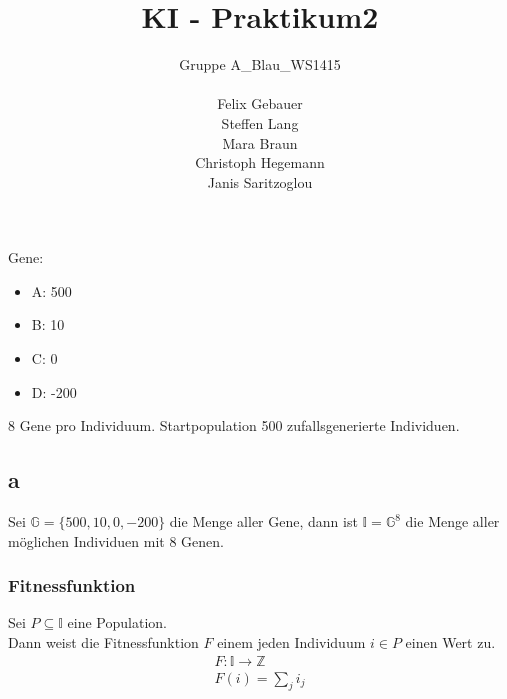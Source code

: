 \documentclass[12pt, a4paper]{article}
\title{KI - Praktikum2}
\author{Gruppe A\_Blau\_WS1415\\\\
    Felix Gebauer\\
    Steffen Lang\\
    Mara Braun\\
    Christoph Hegemann\\
    Janis Saritzoglou}
\begin{document}
\maketitle
\newpage
\section{}
Gene:
\begin{itemize}
\item A: 500
\item B: 10
\item C: 0
\item D: -200
\end{itemize}
8 Gene pro Individuum. Startpopulation 500 zufallsgenerierte
Individuen.

\subsection*{a}
Sei $\mathbb{G} = \{500,10,0,-200\}$ die Menge aller Gene, dann ist
$\mathbb{I} = \mathbb{G}^8$ die Menge aller möglichen Individuen mit 8
Genen.

\subsubsection*{Fitnessfunktion}
Sei $P \subseteq \mathbb{I}$ eine Population.\\
Dann weist die Fitnessfunktion $F$ einem jeden Individuum $i \in P$
einen Wert zu.\\
\begin{align*}
F: \mathbb{I} \longrightarrow \mathbb{Z}\\
F(i) = \sum_j i_j
\end{align*}
\end{document}
